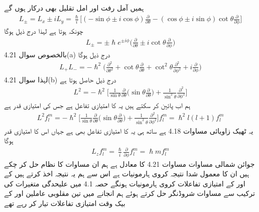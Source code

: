 ہمیں آمل رفت اور امل تقلیل بھی درکار ہوں گے 
\begin{align*}
L_{\pm} = L_x \pm i L_y = \frac{\hslash}{i} \big [ (- \sin \phi \pm i \cos \phi) \frac{\partial}{\partial \theta} - (\cos \phi \pm i \sin \phi) \cot \theta \frac{\partial}{\partial \phi} \big ]
\end{align*}
چونکہ  ہوتا ہے لہذا درج ذیل ہوگا 
\begin{align}
L_{\pm} = \pm \hslash e^{\pm i \phi} \big ( \frac{\partial}{\partial \theta} \pm i \cot \theta \frac{\partial}{\partial \phi} \big )
\end{align}
بالخصوص سوال 4.21(a) درج ذیل ہوگا 
\begin{align}
L_{+} L_{-} = - \hslash^2 \big ( \frac{\partial^2}{\partial \theta^2} + \cot \theta \frac{\partial}{\partial \theta} + \cot^2 \theta \frac{\partial^2}{\partial \phi^2} + i \frac{\partial}{\partial \phi} \big )
\end{align}
لہذا سوال 4.21(b) درج ذیل حاصل ہوتا ہے 
\begin{align}
L^2 = - \hslash^2 \big [ \frac{1}{\sin \theta} \frac{\partial}{\partial \theta} \big ( \sin \theta \frac{\partial}{\partial \theta} \big ) + \frac{1}{\sin^2 \theta} \frac{\partial^2}{\partial \phi^2} \big ]
\end{align}
ہم اب  پائين کر سکتے ہیں یہ  کا امتیازی تفاعل ہے جس کی امتیازی قدر  ہے 
\begin{align*}
L^2 f_l^m = - \hslash^2 \big [ \frac{1}{\sin \theta} \frac{\partial}{\partial \theta} \big ( \sin \theta \frac{\partial}{\partial \theta} \big ) + \frac{1}{\sin^2 \theta} \frac{\partial^2}{\partial \phi^2} \big ] f_l^m = \hslash^2 l (l + 1) f_l^m
\end{align*}
یہ ٹھیک زاویائی مساوات 4.18 ہے ساتھ ہی یہ  کا امتیازی تفاعل بھی ہے جہاں اس کا امتیازی قدر  ہوگا 
\begin{align*}
L_z f_l^m = \frac{\hslash}{i} \frac{\partial}{\partial \phi} f_l^m = \hslash m f_l^m
\end{align*}
جوائن شمالی مساوات مساوات 4.21 کا معادل ہے ہم ان مساوات کا نظام حل کر چکے ہیں ان کا معمول شدا نتیجہ کروی ہارمونیات  ہے اس سے ہم یہ نتیجہ اخذ کرتے ہیں کے  اور  کے امتیازی تفاعلات کروی ہارمونیات ہونگے حصہ 4.1 میں علیحدگی متغیرات کی ترکیب سے مساوات شروڈنگر حل کرتے ہوئے ہم انجانے میں تین مقلوبی عاملین   اور  کے بیک وقت امتیازی تفاعلات تیار کر رہے تھے 

